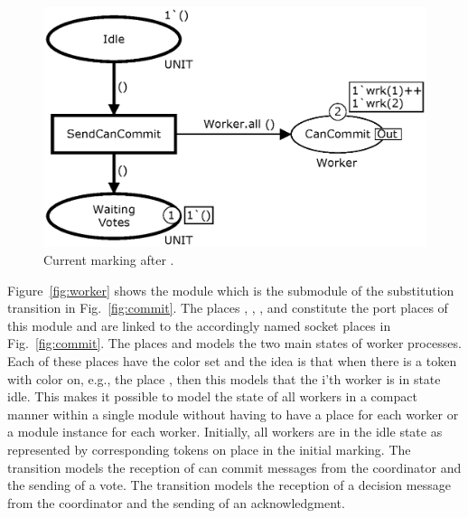 \begin{figure}[h]
\centering
\includegraphics[scale=.5]{figures/SendCanCommit.eps}
\caption{Current marking after .}
\label{fig:sendcancommit}
\end{figure}





Figure~\ref{fig:worker} shows the  module which is the
submodule of the  substitution transition in
Fig.~\ref{fig:commit}. The places ,
, , and 
constitute the port places of this module and are linked to the
accordingly named socket places in Fig.~\ref{fig:commit}. The places
 and  models the two main
states of worker processes. Each of these places have the color set
 and the idea is that when there is a token with color
 on, e.g., the place , then this models
that the i'th worker is in state idle. This makes it possible to model
the state of all workers in a compact manner within a single module
without having to have a place for each worker or a module instance
for each worker. Initially, all workers are in the idle state as
represented by corresponding tokens on place  in the
initial marking. The transition  models the
reception of can commit messages from the coordinator and the sending
of a vote. The transition  models the
reception of a decision message from the coordinator and the sending
of an acknowledgment.

